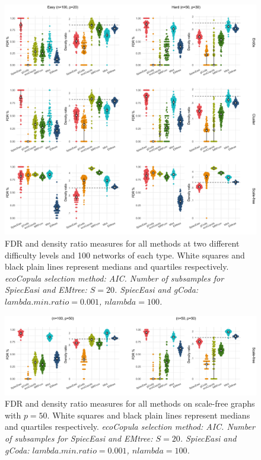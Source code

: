 \begin{figure}
    \centering
    \includegraphics[width=\linewidth]{figs/correct_TPFN.png}
    \caption{FDR and density ratio measures for all methods at two different difficulty levels and 100 networks of each type. White squares and black plain lines represent medians and quartiles respectively. \small{\textit{ecoCopula selection method: AIC. Number of subsamples for SpiecEasi and EMtree: $S=20$. SpiecEasi and gCoda: $lambda.min.ratio=0.001$,  $nlambda=100$.}}}
    \label{TPFN}
\end{figure}
\begin{figure}
    \centering
    \includegraphics[width=\linewidth]{figs/BadSF_TPFN_title.png}
    \caption{FDR and density ratio measures for all methods on scale-free graphs with $p=50$. White squares and black plain lines represent medians and quartiles respectively. \small{\textit{ecoCopula selection method: AIC. Number of subsamples for SpiecEasi and EMtree: $S=20$. SpiecEasi and gCoda: $lambda.min.ratio=0.001$,  $nlambda=100$.}}}
    \label{SF50}
\end{figure}

